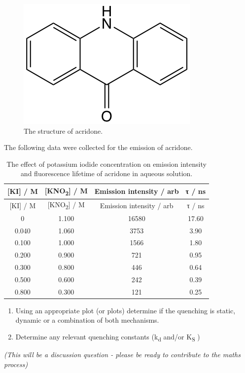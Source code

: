 \documentclass[
]{book}
\begin{document}
\begin{figure}

{\centering \includegraphics[width=0.3\linewidth]{images/acridone} 

}

\caption{The structure of acridone.}\label{fig:acridone}
\end{figure}

The following data were collected for the emission of acridone.

\begin{longtable}[]{@{}cccc@{}}
\caption{\label{tab:acridonequench} The effect of potassium iodide concentration on emission intensity and fluorescence lifetime of acridone in aqueous solution.}\tabularnewline
\toprule
{[}KI{]} / M & {[}KNO\textsubscript{2}{]} / M & Emission intensity / arb & τ / ns\tabularnewline
\midrule
\endfirsthead
\toprule
{[}KI{]} / M & {[}KNO\textsubscript{2}{]} / M & Emission intensity / arb & τ / ns\tabularnewline
\midrule
\endhead
0 & 1.100 & 16580 & 17.60\tabularnewline
0.040 & 1.060 & 3753 & 3.90\tabularnewline
0.100 & 1.000 & 1566 & 1.80\tabularnewline
0.200 & 0.900 & 721 & 0.95\tabularnewline
0.300 & 0.800 & 446 & 0.64\tabularnewline
0.500 & 0.600 & 242 & 0.39\tabularnewline
0.800 & 0.300 & 121 & 0.25\tabularnewline
\bottomrule
\end{longtable}

\begin{enumerate}
\def\labelenumi{\arabic{enumi}.}
\item
  Using an appropriate plot (or plots) determine if the quenching is static, dynamic or a combination of both mechanisms.
\item
  Determine any relevant quenching constants (k\textsubscript{d} and/or K\textsubscript{S} )
\end{enumerate}

\emph{(This will be a discussion question - please be ready to contribute to the maths process)}

  
\end{document}
